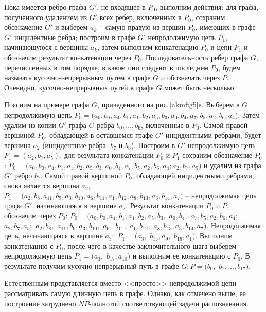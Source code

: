 Пока имеется ребро графа $G'$, не входящее в $P_0$, выполним действия: для графа, полученного удалением из $G'$ всех ребер, включенных в $P_0$, сохраним обозначение $G'$ и выберем $a_k$ -- самую правую из вершин $P_0$, имеющих в графе $G'$ инцидентные ребра; построим в графе $G'$ непродолжимую цепь $P_1$, начинающуюся с вершины $a_k$, затем выполним конкатенацию $P_0$ и цепи $P_1$ и обозначим результат конкатенации через $P_0$.
Последовательность ребер графа $G$, перечисленных в том порядке, в каком они следуют в последнем $P_0$, будем называть кусочно-непрерывным путем в графе $G$ и обозначать через $P$. Очевидно, кусочно-непрерывных путей в графе $G$ может быть несколько.
\par\medskip
Поясним на примере графа $G$, приведенного на рис.\,\ref{akmfig5}а. Выберем в $G$ непродолжимую цепь
${P_0=(a_0,b_0,}{a_4,b_1,a_1,}{b_2,a_5,b_3,}{a_0,b_4,a_7,}{b_5,a_2,}{b_6,a_4)}.$
Затем удалим из копии $G'$ графа $G$ ребра $b_0,\dots,b_6$, включенные в $P_0$. Самой правой вершиной $P_0$, обладающей в оставшемся графе $G'$ инцидентными ребрами, будет вершина $a_2$ (инцидентные ребра: $b_7$ и $b_8$). Построим в $G'$ непродолжимую цепь $P_1= (a_2,b_7,a_5)$; для результата конкатенации $P_0$ и $P_1$ сохраним обозначение $P_0$:
${P_0=(a_0,b_0,}{a_4,b_1,a_1,}{b_2,a_5,b_3,}{a_0,b_4,a_7,}{b_5,a_2,b_6,}{a_4;}{ a_2,b_7,a_5)}$
и удалим из графа $G'$ ребро $b_7$. Самой правой вершиной $P_0$, обладающей инцидентными ребрами, снова является вершина $a_2$, ${P_1= (a_2,}{b_8,a_{11},}{b_9,a_3,}{b_{10},a_6,}{b_{11},a_1,b_{12},}{a_8,b_{13},}{a_3,b_{14},a_7)}$ -- непродолжимая цепь графа $G'$, начинающаяся в вершине $a_2$. Результат конкатенации $P_0$ и $P_1$ обозначим через $P_0$:
${P_0=(a_0,b_0,}{a_4,b_1,}{a_1,b_2,}{a_5,b_3,}$ ${a_0,b_4,}$ ${a_7,b_5,}{a_2,b_6,a_4;}$ ${a_2,b_7,a_5;}$ $
{a_2,b_8,}$ ${a_{11},b_9,}{a_3,b_{10},}$ ${a_6,}$ ${b_{11},}$ ${a_1,b_{12},}$ ${a_8,b_{13},}{a_3,b_{14},}{a_7)}$.
Непродолжимая цепь, начинающаяся в вершине ${a_3:}$ ${P_1 = (a_3,}$ ${b_{15},a_9,}$ ${b_{16},a_1)}$. Выполним конкатенацию с $P_0$, после чего в качестве заключительного шага выберем непродолжимую цепь ${P_1=(a_3,}$ ${b_{17},a_{10})}$ и выполним ее конкатенацию с $P_0$. В результате получим кусочно-непрерывный путь в графе ${G: P=(b_0,}$ ${b_1,\dots,b_{17})}$.
\par\medskip
\begin{remark} Естественным представляется вместо <<просто>> непродолжимой цепи рассматривать самую длинную цепь в графе. Однако, как отмечено выше, ее построение затруднено $NP$-полнотой соответствующей задачи распознавания.
\end{remark}


